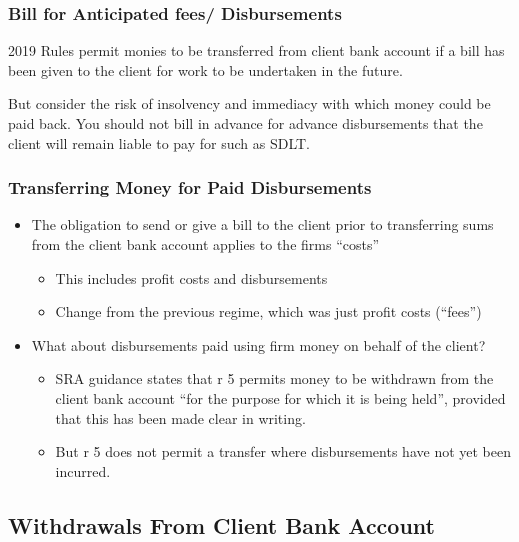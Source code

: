 \documentclass[
]{article}
\providecommand{\tightlist}{%
  \setlength{\itemsep}{0pt}\setlength{\parskip}{0pt}}
\begin{document}
\hypertarget{bill-for-anticipated-fees-disbursements}{%
\subsubsection{Bill for Anticipated fees/
Disbursements}\label{bill-for-anticipated-fees-disbursements}}

2019 Rules permit monies to be transferred from client bank account if a
bill has been given to the client for work to be undertaken in the
future.

But consider the risk of insolvency and immediacy with which money could
be paid back. You should not bill in advance for advance disbursements
that the client will remain liable to pay for such as SDLT.

\hypertarget{transferring-money-for-paid-disbursements}{%
\subsubsection{Transferring Money for Paid
Disbursements}\label{transferring-money-for-paid-disbursements}}

\begin{itemize}
\tightlist
\item
  The obligation to send or give a bill to the client prior to
  transferring sums from the client bank account applies to the firms
  ``costs''

  \begin{itemize}
  \tightlist
  \item
    This includes profit costs and disbursements
  \item
    Change from the previous regime, which was just profit costs
    (``fees'')
  \end{itemize}
\item
  What about disbursements paid using firm money on behalf of the
  client?

  \begin{itemize}
  \tightlist
  \item
    SRA guidance states that r 5 permits money to be withdrawn from the
    client bank account ``for the purpose for which it is being held'',
    provided that this has been made clear in writing.
  \item
    But r 5 does not permit a transfer where disbursements have not yet
    been incurred.
  \end{itemize}
\end{itemize}

\hypertarget{withdrawals-from-client-bank-account}{%
\subsection{Withdrawals From Client Bank
Account}\label{withdrawals-from-client-bank-account}}
\end{document}
